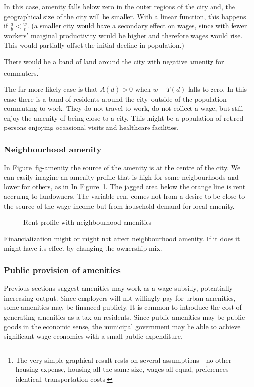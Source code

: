 In this case, amenity falls below zero in the outer regions of the city and, the geographical size of the city will be smaller. With a linear function, this happens if $\frac{a}{b} < \frac{w}{t}$. (a smaller city would have a secondary effect on wages, since with fewer workers' marginal productivity would be higher and therefore wages would rise. This would partially offset the initial decline in population.)

 There would be a band of land around the city with negative amenity for commuters.\footnote{The very simple graphical result rests on several assumptions - no other housing expense, housing all the same size, wages all equal, preferences identical, transportation costs.}

The far more likely case is that $A(d) > 0$ when $w-T(d)$ falls to zero. In this case there is a band of residents around the city, outside of the population commuting to work. They do not travel to work,  do not collect a wage, but still enjoy the amenity of being close to a city. This might be a population of retired persons enjoying occasional visits and healthcare facilities.


\subsubsection{Neighbourhood amenity}
In Figure~{fig-amenity} the source of the amenity is at the centre of the city. We can easily imagine an amenity profile that is high for some neigbourhoods and lower for others, as in  In Figure~\ref{fig-amenity2}. The jagged area below the orange line is rent accruing to landowners. The variable rent comes not from a desire to be close to the source of the wage income but from household demand for local amenity.  

\begin{figure}[tb]
\begin{center}

\end{center}
\caption{Rent profile with neighbourhood amenities}
\label{fig-amenity2}
\end{figure}
Financialization might or might not affect neighbourhood amenity. If it does it might have its effect by changing the ownership mix.

\subsubsection{Public provision of amenities}

Previous sections suggest amenities may work as a wage subsidy, potentially increasing output. Since employers will not willingly pay for urban amenities, some amenities may be financed publicly. It is common to introduce the cost of generating amenities as a tax on residents.  Since public amenities may be \glspl{public good} in the economic sense, the municipal government may be able to achieve significant wage economies with a small public expenditure.


